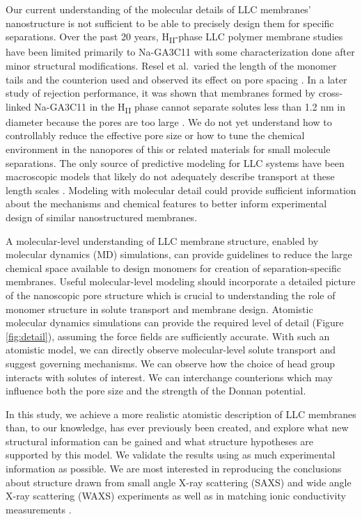 \documentclass[journal=jpcbfk,manuscript=article]{achemso}
\begin{document}
  Our current understanding of the molecular details of LLC membranes' nanostructure
  is not sufficient to be able to precisely design them for specific separations. 
  Over the past 20 years, H\textsubscript{II}-phase LLC polymer membrane studies have
  been limited primarily to Na-GA3C11 with some characterization done after minor 
  structural modifications. Resel et al.~varied the length of the monomer tails and the
  counterion used and observed its effect on pore spacing \cite{resel_structural_2000}.
  In a later study of rejection performance, it was shown that membranes formed by cross-
  linked Na-GA3C11 in the H\textsubscript{II} phase cannot separate solutes less than 1.2 
  nm in diameter because the pores are too large \cite{zhou_supported_2005}. We do not
  yet understand how to controllably reduce the effective pore size or how to tune
  the chemical environment in the nanopores of this or related materials for
  small molecule separations. The only source of predictive modeling for LLC
  systems have been macroscopic models that likely do not adequately describe
  transport at these length scales \cite{hatakeyama_water_2011}. Modeling with molecular
  detail could provide sufficient information about the mechanisms and chemical features
  to better inform experimental design of similar nanostructured membranes. 

  A molecular-level understanding of LLC membrane structure, enabled by
  molecular dynamics (MD) simulations, can provide guidelines to reduce the large
  chemical space available to design monomers for creation of separation-specific
  membranes. Useful molecular-level modeling should incorporate a detailed picture of the
  nanoscopic pore structure which is crucial to understanding the role of
  monomer structure in solute transport and membrane design. 
  Atomistic molecular dynamics simulations can provide the required level of detail
  (Figure \ref{fig:detail}), assuming the force fields are sufficiently accurate.
  With such an atomistic model, we can directly observe molecular-level solute
  transport and suggest governing mechanisms. We can observe how the choice of
  head group interacts with solutes of interest. We can interchange
  counterions which may influence both the pore size and the strength of the
  Donnan potential. 

  In this study, we achieve a  more realistic atomistic description of LLC
  membranes than, to our knowledge, has ever previously been created, and explore
  what new structural information can be gained and what structure hypotheses are
  supported by this model. We validate the results using as much experimental
  information as possible. We are most interested in reproducing the conclusions
  about structure drawn from small angle X-ray scattering (SAXS) and wide angle
  X-ray scattering (WAXS) experiments as well as in matching ionic conductivity
  measurements \cite{feng_thin_2016}.
\end{document}
